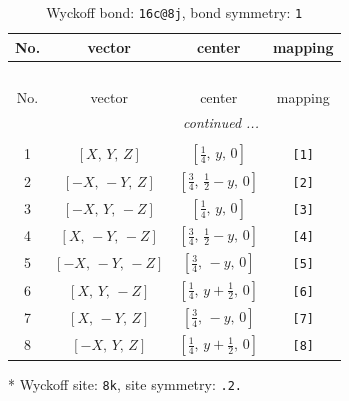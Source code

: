 \documentclass[fleqn,8pt]{jsarticle}
\begin{document}
\renewcommand{\arraystretch}{1.2}
\begin{longtable}{cccc}
\caption{Wyckoff bond: {\tt 16c@8j}, bond symmetry: {\tt 1}}
 \\
 \hline \hline
No. & vector & center & mapping \\ \hline \endfirsthead

\multicolumn{3}{l}{\tablename\ \thetable{}} \\
 \hline \hline
No. & vector & center & mapping \\ \hline \endhead

 \hline \hline
\multicolumn{3}{r}{\footnotesize\it continued ...} \\ \endfoot

 \hline \hline
\multicolumn{3}{r}{} \\ \endlastfoot

1 & $\left[ X,\, Y,\, Z \right]$ & $\left[ \frac{1}{4},\, y,\, 0 \right]$ & {\tt [1]} \\ \hline
2 & $\left[ - X,\, - Y,\, Z \right]$ & $\left[ \frac{3}{4},\, \frac{1}{2} - y,\, 0 \right]$ & {\tt [2]} \\ \hline
3 & $\left[ - X,\, Y,\, - Z \right]$ & $\left[ \frac{1}{4},\, y,\, 0 \right]$ & {\tt [3]} \\ \hline
4 & $\left[ X,\, - Y,\, - Z \right]$ & $\left[ \frac{3}{4},\, \frac{1}{2} - y,\, 0 \right]$ & {\tt [4]} \\ \hline
5 & $\left[ - X,\, - Y,\, - Z \right]$ & $\left[ \frac{3}{4},\, - y,\, 0 \right]$ & {\tt [5]} \\ \hline
6 & $\left[ X,\, Y,\, - Z \right]$ & $\left[ \frac{1}{4},\, y + \frac{1}{2},\, 0 \right]$ & {\tt [6]} \\ \hline
7 & $\left[ X,\, - Y,\, Z \right]$ & $\left[ \frac{3}{4},\, - y,\, 0 \right]$ & {\tt [7]} \\ \hline
8 & $\left[ - X,\, Y,\, Z \right]$ & $\left[ \frac{1}{4},\, y + \frac{1}{2},\, 0 \right]$ & {\tt [8]} \\
\end{longtable}
* Wyckoff site: {\tt 8k}, site symmetry: {\tt .2.}
\renewcommand{\arraystretch}{1.2}
\end{document}
